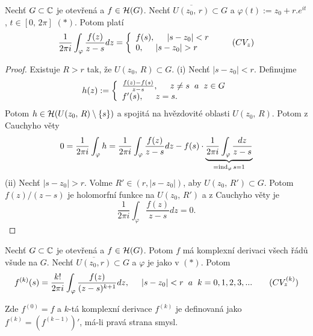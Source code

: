 
\begin{theorem}
Nechť $G\subset{\operatorname{\mathbb{C}}}$ je otevřená a $f\in\operatorname{\mathcal{H}} (G)$. Nechť $\overline{U(z_0,\, r)}\subset{G}$ a $\varphi{(t)}:=z_0+r.e^{it}$, $t\in{[0,\, 2\pi]}$ $(*)$. Potom platí 
\begin{equation}
    \frac{1}{2\pi{i}}\int_\varphi{\frac{f(z)}{z-s}dz}=
\left\{
	\begin{array}{ll}
		f(s), \hspace{5mm} |s-z_0|<r\\
		0,\hspace{5mm} |s-z_0|>r
	\end{array}
\right.
\tag{$CV_z$}
\label{eqn:cvz}
\end{equation}
\end{theorem}

\begin{proof}
Existuje $R>r$ tak, že $U(z_0,\, R)\subset{G}$.\newline
(i) Nechť $|s-z_0|<r$. Definujme 
\[h(z):=
\left\{
	\begin{array}{ll}
		\frac{f(z)-f(s)}{z-s},\hspace{5mm}z\neq{s}\hspace{2mm} a\hspace{2mm} z\in{G}\\
		f'(s),\hspace{5mm}z=s.
	\end{array}
\right.\]
Potom $h\in\operatorname{\mathcal{H}} (U(z_0,\, R)\setminus\{s\})$ a spojitá na hvězdovité oblasti $U(z_0,\, R)$. Potom z Cauchyho věty 
\[0=
\frac{1}{2\pi{i}}\int_\varphi{h}=
\frac{1}{2\pi{i}}\int_\varphi{\frac{f(z)}{z-s}}dz-f(s)\cdot \underbrace{\frac{1}{2\pi{i}}\int_\varphi{\frac{dz}{z-s}}}_{=\operatorname{ind}_\varphi{s} = 1}
\]
(ii) Nechť $|s-z_0|>r$. Volme $R'\in(r,|s-z_0|)$, aby $U(z_0,\, R')\subset{G}$. Potom $f(z)/(z-s)$ je holomorfní funkce na $U(z_0,\, R')$ a z Cauchyho věty je 
\[\frac{1}{2\pi{i}}\int_\varphi{\frac{f(z)}{z-s}}dz =0.\]
\end{proof}

\begin{consequence}
Nechť $G\subset{\operatorname{\mathbb{C}}}$ je otevřená a $f\in\operatorname{\mathcal{H}} (G)$. Potom $f$ má komplexní derivaci všech řádů všude na $G$. Nechť $\overline{U(z_0,r)}\subset{G}$ a $\varphi$ je jako v $(*)$. Potom 
\begin{equation}
f^{(k)}(s)=
\frac{k!}{2\pi{i}}\int_\varphi{\frac{f(z)}{(z-s)^{k+1}}}dz,\hspace{5mm} |s-z_0|<r\hspace{2mm} a\hspace{2mm} k = 0,1,2,3,... 
\tag{$CV^{(k)}_z$}
\label{eqn:cvkz}
\end{equation}

Zde $f^{(0)}=f$ a $k$-tá komplexní derivace $f^{(k)}$ je definovaná jako $f^{(k)}=(f^{(k-1)})'$, má-li pravá strana smysl.
\end{consequence}

